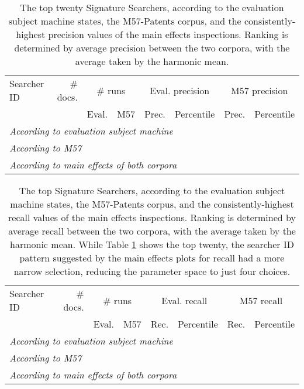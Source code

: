 \documentclass[11pt]{ucthesis}
\theoremstyle{plain}
\theoremstyle{definition}
\begin{document}
\begin{table}[htp]
\caption{\label{tbl:top20:bymaineffects:precision}The top twenty Signature Searchers, according to the evaluation subject machine states, the M57-Patents corpus, and the consistently-highest precision values of the main effects inspections.  Ranking is determined by average precision between the two corpora, with the average taken by the harmonic mean.}
\centering
\begin{small}
\begin{tabular}{lr|rr|rr|rr}
\toprule
Searcher ID & \# docs. & \multicolumn{2}{c|}{\# runs} & \multicolumn{2}{c|}{Eval. precision} & \multicolumn{2}{c}{M57 precision} \\
 & & Eval. & M57 & Prec. & Percentile & Prec. & Percentile \\
\midrule
\multicolumn{8}{l}{\emph{According to evaluation subject machine}} \\

\midrule
\multicolumn{8}{l}{\emph{According to M57}} \\

\midrule
\multicolumn{8}{l}{\emph{According to main effects of both corpora}} \\

\bottomrule
\end{tabular}
\end{small}
\end{table}

\begin{table}[htp]
\caption{\label{tbl:top20:bymaineffects:recall}The top Signature Searchers, according to the evaluation subject machine states, the M57-Patents corpus, and the consistently-highest recall values of the main effects inspections.  Ranking is determined by average recall between the two corpora, with the average taken by the harmonic mean.  While Table \ref{tbl:top20:bymaineffects:precision} shows the top twenty, the searcher ID pattern suggested by the main effects plots for recall had a more narrow selection, reducing the parameter space to just four choices.}
\centering
\begin{small}
\begin{tabular}{lr|rr|rr|rr}
\toprule
Searcher ID & \# docs. & \multicolumn{2}{c|}{\# runs} & \multicolumn{2}{c|}{Eval. recall} & \multicolumn{2}{c}{M57 recall} \\
 & & Eval. & M57 & Rec. & Percentile & Rec. & Percentile \\
\midrule
\multicolumn{8}{l}{\emph{According to evaluation subject machine}} \\

\midrule
\multicolumn{8}{l}{\emph{According to M57}} \\

\midrule
\multicolumn{8}{l}{\emph{According to main effects of both corpora}} \\

\bottomrule
\end{tabular}
\end{small}
\end{table}
\end{document}
